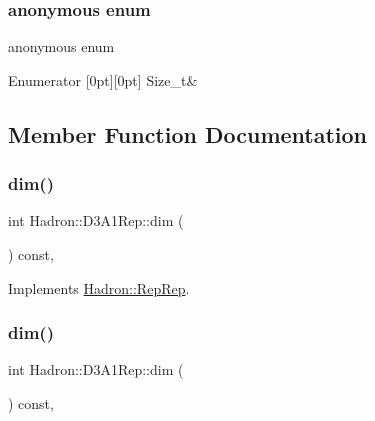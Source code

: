 \subsubsection{\texorpdfstring{anonymous enum}{anonymous enum}}
{\footnotesize\ttfamily anonymous enum}

\begin{DoxyEnumFields}{Enumerator}
[0pt][0pt]{}\mbox{\label{structHadron_1_1D3A1Rep_ad717061e32c791ea69c243aa5bbec3aeaebf01365c47c9e66ebd0e9bebb340fca}} 
Size\+\_\+t&\\
\hline

\end{DoxyEnumFields}


\subsection{Member Function Documentation}
\mbox{\label{structHadron_1_1D3A1Rep_abb120c31183935cf98330a4085ff6b1c}} 
\subsubsection{\texorpdfstring{dim()}{dim()}\hspace{0.1cm}{\footnotesize\ttfamily [1/5]}}
{\footnotesize\ttfamily int Hadron\+::\+D3\+A1\+Rep\+::dim (\begin{DoxyParamCaption}{ }\end{DoxyParamCaption}) const\hspace{0.3cm}{\ttfamily [inline]}, {\ttfamily [virtual]}}



Implements \mbox{\hyperlink{structHadron_1_1RepRep_a92c8802e5ed7afd7da43ccfd5b7cd92b}{Hadron\+::\+Rep\+Rep}}.

\mbox{\label{structHadron_1_1D3A1Rep_abb120c31183935cf98330a4085ff6b1c}} 
\subsubsection{\texorpdfstring{dim()}{dim()}\hspace{0.1cm}{\footnotesize\ttfamily [2/5]}}
{\footnotesize\ttfamily int Hadron\+::\+D3\+A1\+Rep\+::dim (\begin{DoxyParamCaption}{ }\end{DoxyParamCaption}) const\hspace{0.3cm}{\ttfamily [inline]}, {\ttfamily [virtual]}}




